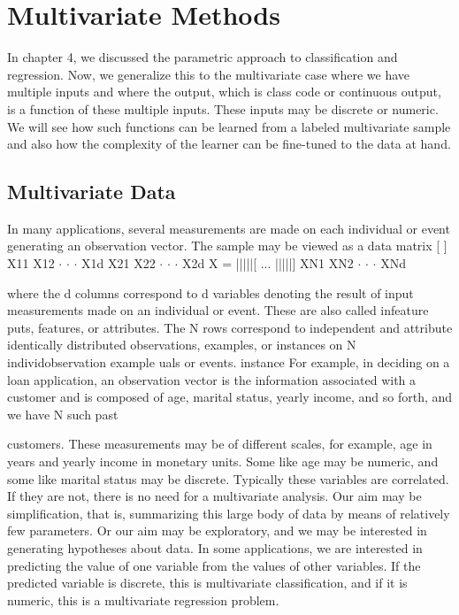 \chapter{Multivariate Methods}
\label{chap:05-multivariate-methods}

In chapter 4, we discussed the parametric approach to classification and regression. Now, we generalize this to the multivariate case where we have multiple inputs and where the output, which is class code or continuous output, is a function of these multiple inputs. These inputs may be discrete or numeric. We will see how such functions can be learned from a labeled multivariate sample and also how the complexity of the learner can be fine-tuned to the data at hand.

\section{Multivariate Data}

In many applications, several measurements are made on each individual or event generating an observation vector. The sample may be viewed as a data matrix [ ] X11 X12 $\cdot$ $\cdot$ $\cdot$ X1d X21 X22 $\cdot$ $\cdot$ $\cdot$ X2d X = |||||[ ... |||||] XN1 XN2 $\cdot$ $\cdot$ $\cdot$ XNd

where the d columns correspond to d variables denoting the result of input measurements made on an individual or event. These are also called infeature puts, features, or attributes. The N rows correspond to independent and attribute identically distributed observations, examples, or instances on N individobservation example uals or events. instance For example, in deciding on a loan application, an observation vector is the information associated with a customer and is composed of age, marital status, yearly income, and so forth, and we have N such past

customers. These measurements may be of different scales, for example, age in years and yearly income in monetary units. Some like age may be numeric, and some like marital status may be discrete. Typically these variables are correlated. If they are not, there is no need for a multivariate analysis. Our aim may be simplification, that is, summarizing this large body of data by means of relatively few parameters. Or our aim may be exploratory, and we may be interested in generating hypotheses about data. In some applications, we are interested in predicting the value of one variable from the values of other variables. If the predicted variable is discrete, this is multivariate classification, and if it is numeric, this is a multivariate regression problem.

